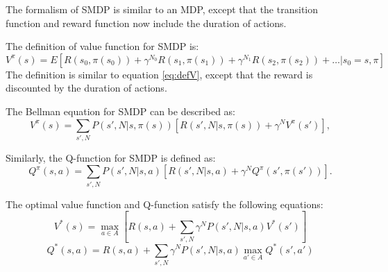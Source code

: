 The formalism of SMDP is similar to an MDP, except that the transition function and reward function
now include the duration of actions. 

The definition of value function for SMDP is:
\begin{equation}
    V^{\pi}(s) = E[R(s_0, \pi(s_0)) + \gamma^{N_0} R(s_1, \pi(s_1)) + \gamma^{N_1} R(s_2, \pi(s_2)) + \dots | s_0 = s, \pi]
\end{equation}
The definition is similar to equation \ref{eq:defV}, except that the reward is discounted by
the duration of actions.

The Bellman equation for SMDP can be described as:
\begin{equation}
    V^{\pi}(s) = \sum_{s', N}P(s', N|s, \pi(s))[R(s', N|s, \pi(s)) + \gamma^N V^{\pi}(s')],
    \label{eq:SMDPV}
\end{equation}

Similarly, the Q-function for SMDP is defined as:
\begin{equation}
    Q^{\pi}(s, a) = \sum_{s', N}P(s', N|s, a)[R(s', N|s, a) + \gamma^N Q^{\pi}(s', \pi(s'))].
    \label{eq:SMDPQ}
\end{equation}

The optimal value function and Q-function satisfy the following equations:
\begin{equation}
    V^*(s) = \max_{a \in A} [R(s, a) + \sum_{s', N} \gamma^N P(s', N|s, a)V^*(s')]
\end{equation}
\begin{equation}
    Q^*(s, a) = R(s, a) + \sum_{s', N} \gamma^N P(s', N|s, a) \max_{a' \in A} Q^*(s', a')
\end{equation}




